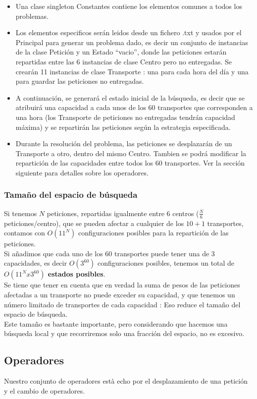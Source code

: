 \documentclass{article}
\begin{document}
\begin{itemize}
\item Una clase singleton Constantes contiene los elementos comunes a todos los
problemas.
\item Los elementos especificos serán leidos desde un fichero .txt y usados por
el Principal para generar un problema dado, es decir un conjunto de instancias
de la clase Petición y un Estado ``vacio'', donde las peticiones estarán
repartidas entre las 6 instancias de clase Centro pero no entregadas. Se crearán
11 instancias de clase Transporte : una para cada hora del día y una para
guardar las peticiones no entregadas.
\item A continuación, se generará el estado inicial de la búsqueda, es decir que
se atribuirá una capacidad a cada unos de los 60 transportes que corresponden a
una hora (los Transporte de peticiones no entregadas tendrán capacidad máxima) y
se repartirán las peticiones según la estrategia especificada.
\item Durante la resolución del problema, las peticiones se desplazarán de un
Transporte a otro, dentro del mismo Centro. Tambien se podrá modificar la
repartición de las capacidades entre todos los 60 transportes. Ver la sección
siguiente para detalles sobre los operadores.
\end{itemize}
\subsubsection{Tamaño del espacio de búsqueda}
Si tenemos $N$ peticiones, repartidas igualmente entre 6 centros ($\frac{N}{6}$
peticiones/centro), que se pueden afectar a cualquier de los $10+1$ transportes,
contamos con $O(11^N)$ configuraciones posibles para la repartición de las
peticiones.\\
Si añadimos que cada uno de los 60 transportes puede tener una de 3 capacidades,
es decir $O(3^{60})$ configuraciones posibles, tenemos un total de
\textbf{$O(11^Nx3^{60})$ estados posibles}.\\
\indent Se tiene que tener en cuenta que en verdad la suma de pesos de las
peticiones afectadas a un transporte no puede exceder su capacidad, y que
tenemos un número limitado de transportes de cada capacidad : Eso reduce el
tamaño del espacio de búsqueda.\\
\indent Este tamaño es bastante importante, pero considerando que hacemos una
búsqueda local y que recorriremos solo una fracción del espacio, no es excesivo.

\subsection{Operadores}
Nuestro conjunto de operadores està echo por el desplazamiento de una petición y el cambio de operadores.
\end{document}
